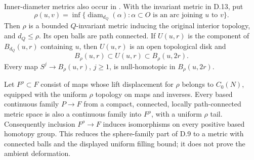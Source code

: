 Inner-diameter metrics also occur in
\cite[Definition 2.2]{DE_Fabel1998}.  With the invariant metric
in D.13, put
\[
 \rho(u,v)=\inf\{\operatorname{diam}_{d_Q}(\alpha):
   \alpha\subset O\text{ is an arc joining }u\text{ to }v\}.
\]
Then $\rho$ is a bounded $Q$-invariant metric inducing the original
interior topology, and $d_Q\leq\rho$.  Its open balls are path
connected.  If $U(u,r)$ is the component of $B_{d_Q}(u,r)$
containing $u$, then $U(u,r)$ is an open topological disk and
\[
 B_\rho(u,r)\subset U(u,r)\subset B_\rho(u,2r).
\]
Every map $S^j\to B_\rho(u,r)$, $j\geq1$, is
null-homotopic in $B_\rho(u,2r)$.

Let $F^\rho\subset F$ consist of maps whose lift displacement for
$\rho$ belongs to $C_0(N)$, equipped with the uniform $\rho$ topology
on maps and inverses.  Every based continuous family $P\to F$ from
a compact, connected, locally path-connected metric space is also
a continuous family into $F^\rho$, with a uniform $\rho$ tail.
Consequently inclusion $F^\rho\to F$ induces isomorphisms on every
positive based homotopy group.  This reduces the sphere-family
part of D.9 to a metric with connected balls and the displayed
uniform filling bound; it does not prove the ambient deformation.

